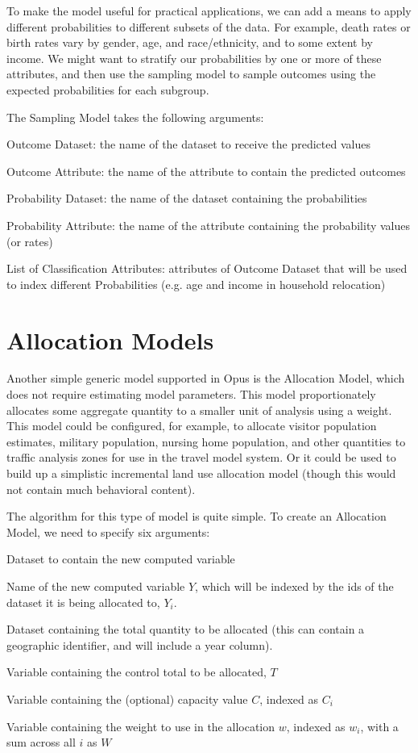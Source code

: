 To make the model useful for practical applications, we can
add a means to apply different probabilities to different
subsets of the data.  For example, death rates or birth
rates vary by gender, age, and race/ethnicity, and to some
extent by income.  We might want to stratify our
probabilities by one or more of these attributes, and then
use the sampling model to sample outcomes using the expected
probabilities for each subgroup.

The Sampling Model takes the following arguments:

\squishlist
\item Outcome Dataset: the name of the dataset to receive the predicted values
\item Outcome Attribute: the name of the attribute to contain the predicted outcomes
\item Probability Dataset: the name of the dataset containing the probabilities
\item Probability Attribute: the name of the attribute
  containing the probability values (or rates)
\item List of Classification Attributes: attributes of
  Outcome Dataset that will be used to index different
  Probabilities (e.g. age and income in household
  relocation) \squishend

\section{Allocation Models}
%
\label{sec:components-allocation-model}
%
Another simple generic model supported in Opus is the
Allocation Model, which does not require estimating model
parameters.  This model proportionately allocates some
aggregate quantity to a smaller unit of analysis using a
weight.  This model could be configured, for example, to
allocate visitor population estimates, military population,
nursing home population, and other quantities to traffic
analysis zones for use in the travel model system.  Or it
could be used to build up a simplistic incremental land use
allocation model (though this would not contain much
behavioral content).

The algorithm for this type of model is quite simple.  To
create an Allocation Model, we need to specify six
arguments:

\squishlist
\item Dataset to contain the new computed variable
\item Name of the new computed variable $Y$, which will be
  indexed by the ids of the dataset it is being allocated
  to, $Y_i$.
\item Dataset containing the total quantity to be allocated
  (this can contain a geographic identifier, and will
  include a year column).
\item Variable containing the control total to be allocated,
  $T$
\item Variable containing the (optional) capacity value $C$,
  indexed as $C_i$
\item Variable containing the weight to use in the
  allocation $w$, indexed as $w_i$, with a sum across all
  $i$ as $W$ \squishend

